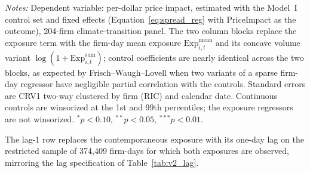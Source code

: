 \begin{table}[!ht]
\begin{threeparttable}
\begin{tablenotes}
\small
\item \textit{Notes:} Dependent variable: per-dollar price impact, estimated with the Model~I control set and fixed effects (Equation~\ref{eq:spread_reg} with PriceImpact as the outcome), 204-firm climate-transition panel. The two column blocks replace the exposure
term with the firm-day mean exposure $\mathrm{Exp}^{\text{mean}}_{i,t}$ and its
concave volume variant $\log(1+\mathrm{Exp}^{\text{sum}}_{i,t})$; control
coefficients are nearly identical across the two blocks, as expected by
Frisch--Waugh--Lovell when two variants of a sparse firm-day regressor have
negligible partial correlation with the controls. Standard errors are CRV1
two-way clustered by firm (RIC) and calendar date. Continuous controls are
winsorized at the 1st and 99th percentiles; the exposure regressors are not
winsorized. $^{*}p<0.10$, $^{**}p<0.05$, $^{***}p<0.01$.
\item[a] The lag-1 row replaces the contemporaneous exposure with its one-day lag on the restricted sample of 374,409 firm-days for which both exposures are observed, mirroring the lag specification of Table~\ref{tab:v2_lag}.
\end{tablenotes}
\end{threeparttable}
\end{table}
